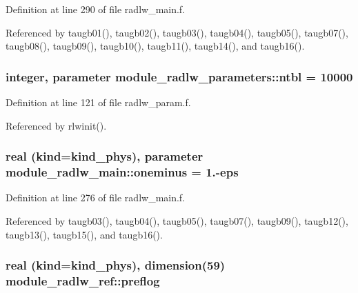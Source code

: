 Definition at line 290 of file radlw\+\_\+main.\+f.



Referenced by taugb01(), taugb02(), taugb03(), taugb04(), taugb05(), taugb07(), taugb08(), taugb09(), taugb10(), taugb11(), taugb14(), and taugb16().

\subsubsection[{\texorpdfstring{ntbl}{ntbl}}]{\setlength{\rightskip}{0pt plus 5cm}integer, parameter module\+\_\+radlw\+\_\+parameters\+::ntbl = 10000}\hypertarget{group__module__radlw__main_ga61ae33b9db5bac9962f72e2a0db3c0e4}{}\label{group__module__radlw__main_ga61ae33b9db5bac9962f72e2a0db3c0e4}


Definition at line 121 of file radlw\+\_\+param.\+f.



Referenced by rlwinit().

\subsubsection[{\texorpdfstring{oneminus}{oneminus}}]{\setlength{\rightskip}{0pt plus 5cm}real (kind=kind\+\_\+phys), parameter module\+\_\+radlw\+\_\+main\+::oneminus = 1.-\/eps\hspace{0.3cm}{\ttfamily [private]}}\hypertarget{group__module__radlw__main_ga8c35a92c2a08663ce04bdf9de8717247}{}\label{group__module__radlw__main_ga8c35a92c2a08663ce04bdf9de8717247}


Definition at line 276 of file radlw\+\_\+main.\+f.



Referenced by taugb03(), taugb04(), taugb05(), taugb07(), taugb09(), taugb12(), taugb13(), taugb15(), and taugb16().

\subsubsection[{\texorpdfstring{preflog}{preflog}}]{\setlength{\rightskip}{0pt plus 5cm}real (kind=kind\+\_\+phys), dimension(59) module\+\_\+radlw\+\_\+ref\+::preflog}\hypertarget{group__module__radlw__main_ga4206f7320b6f1b59eb0132326263d2e4}{}\label{group__module__radlw__main_ga4206f7320b6f1b59eb0132326263d2e4}


